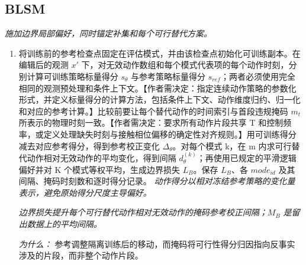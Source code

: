 \documentclass[10pt,a4paper]{article}
\begin{document}
\subsection*{BLSM}
\emph{施加边界局部偏好，同时锚定补集和每个可行替代方案。}
\begin{enumerate}[leftmargin=*,start=4]
  \item 将训练前的参考检查点固定在评估模式，并由该检查点初始化可训练副本。在编辑后的观测 \(x\prime \) 下，对无效动作数组和每个模式代表项的每个动作时刻，分别计算可训练策略标量得分 \(s_\theta \) 与参考策略标量得分 \(s_{ref}\)；两者必须使用完全相同的观测预处理和条件上下文。【作者需决定：指定连续动作策略的参数化形式，并定义标量得分的计算方法，包括条件上下文、动作维度归约、归一化和对应的参考计算。】比较前要让每个替代动作的时间索引与首段违规掩码 \(m_{t}\) 所表示的物理时刻一致。【作者需决定：要求所有动作片段共享 T 和控制频率，或定义处理缺失时刻与接触相位偏移的确定性对齐规则。】用可训练得分减去对应参考得分，得到参考校正变化 \(\Delta _\theta \)。对每个模式 k，在 m 内求可行替代动作相对无效动作的平均变化，得到间隔 \(d_\theta ^(k)\)；再使用已规定的平滑逻辑偏好并对 K 个模式等权平均，生成边界损失 \(L_{B}\)。保存 \(L_{B}\)、各 \(mode_{id}\) 及其间隔、掩码时刻数和逐时得分记录。
\noindent\emph{动作得分以相对冻结参考策略的变化量表示，避免原始得分尺度主导偏好。}
\par{}
\noindent\emph{边界损失提升每个可行替代动作相对无效动作的掩码参考校正间隔；\(M_{B}\) 是留出数据上的平均间隔。}
\par{}
\par\emph{为什么：} 参考调整隔离训练后的移动，而掩码将可行性得分归因指向反事实涉及的片段，而非整个动作片段。

\end{enumerate}
\end{document}
